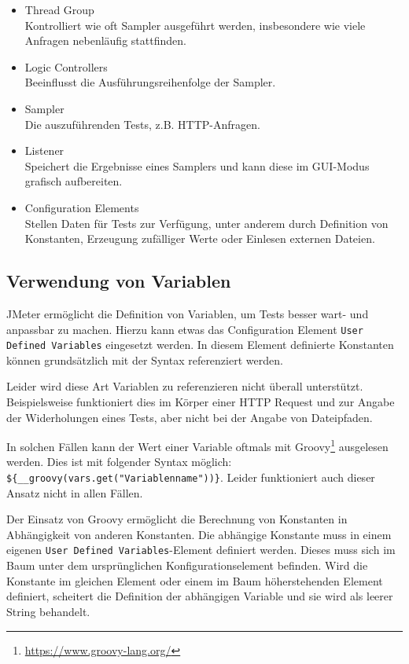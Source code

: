 \begin{itemize}
    \item Thread Group\hfill
          \\Kontrolliert wie oft Sampler ausgeführt werden, insbesondere wie viele Anfragen nebenläufig stattfinden.
    \item Logic Controllers\hfill
          \\Beeinflusst die Ausführungsreihenfolge der Sampler.
    \item Sampler\hfill
          \\Die auszuführenden Tests, z.B. HTTP-Anfragen.
    \item Listener\hfill
          \\Speichert die Ergebnisse eines Samplers und kann diese im GUI-Modus grafisch aufbereiten.
    \item Configuration Elements\hfill
          \\Stellen Daten für Tests zur Verfügung, unter anderem durch Definition von Konstanten, Erzeugung zufälliger Werte oder Einlesen externen Dateien.
\end{itemize}


\subsection{Verwendung von Variablen}

JMeter ermöglicht die Definition von Variablen, um Tests besser wart- und anpassbar zu machen.
Hierzu kann etwas das Configuration Element \texttt{User Defined Variables} eingesetzt werden.
In diesem Element definierte Konstanten können grundsätzlich mit der Syntax  referenziert werden.

Leider wird diese Art Variablen zu referenzieren nicht überall unterstützt.
Beispielsweise funktioniert dies im Körper einer HTTP Request und zur Angabe der Widerholungen eines Tests,
aber nicht bei der Angabe von Dateipfaden.

In solchen Fällen kann der Wert einer Variable oftmals mit Groovy\footnote{\url{https://www.groovy-lang.org/}} ausgelesen werden.
Dies ist mit folgender Syntax möglich: \texttt{\$\{__groovy(vars.get("Variablenname"))\}}.
Leider funktioniert auch dieser Ansatz nicht in allen Fällen.

Der Einsatz von Groovy ermöglicht die Berechnung von Konstanten in Abhängigkeit von anderen Konstanten.
Die abhängige Konstante muss in einem eigenen \texttt{User Defined Variables}-Element definiert werden.
Dieses muss sich im Baum unter dem ursprünglichen Konfigurationselement befinden.
Wird die Konstante im gleichen Element oder einem im Baum höherstehenden Element definiert,
scheitert die Definition der abhängigen Variable und sie wird als leerer String behandelt.

